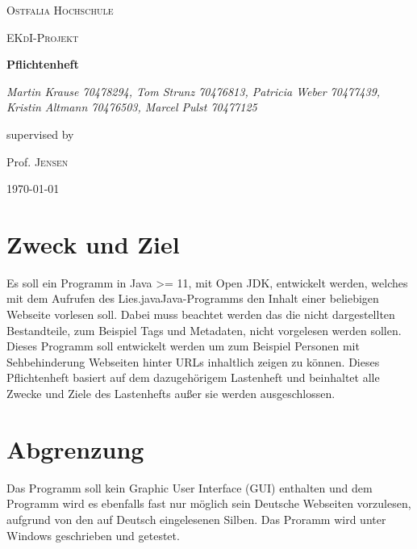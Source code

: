 \documentclass[12pt]{scrartcl}
\begin{document}
\begin{titlepage}
	\centering
	{\scshape\LARGE Ostfalia Hochschule \par}
	\vspace{1cm}
	{\scshape\Large EKdI-Projekt\par}
	\vspace{1.5cm}
	{\huge\bfseries Pflichtenheft\par}
	\vspace{2cm}
	{\Large\itshape Martin Krause 70478294, Tom Strunz 70476813, Patricia Weber 70477439, Kristin Altmann 70476503, Marcel Pulst 70477125\par}
	\vfill
	supervised by\par
	Prof. \textsc{Jensen}

	\vfill

	{\large \today\par}
\end{titlepage}


\tableofcontents
\newpage


\section{Zweck und Ziel}
Es soll ein Programm in Java >= 11, mit Open JDK, entwickelt werden, welches mit dem Aufrufen des \glqq Lies.java\grqq Java-Programms den Inhalt einer beliebigen Webseite vorlesen soll. Dabei muss beachtet werden das die nicht dargestellten Bestandteile, zum Beispiel Tags und Metadaten, nicht vorgelesen werden sollen. Dieses Programm soll entwickelt werden um zum Beispiel Personen mit Sehbehinderung Webseiten hinter URLs inhaltlich zeigen zu können. Dieses Pflichtenheft basiert auf dem dazugehörigem Lastenheft und beinhaltet alle Zwecke und Ziele des Lastenhefts außer sie werden ausgeschlossen.

\section{Abgrenzung}
Das Programm soll kein Graphic User Interface (GUI) enthalten und dem Programm wird es ebenfalls fast nur möglich sein Deutsche Webseiten vorzulesen, aufgrund von den auf Deutsch eingelesenen Silben. Das Proramm wird unter Windows geschrieben und getestet.
\end{document}
